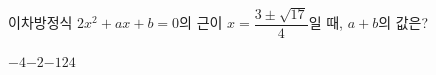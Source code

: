 이차방정식 $2x^2+ax+b=0$의 근이 $x=\dfrac{3\pm\sqrt{17}}{4}$일 때, $a+b$의 값은? 
\begin{choices32}{$-4$}{$-2$}{$-1$}{$2$}{$4$}\end{choices32}
